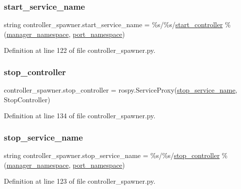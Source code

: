 \subsubsection{\texorpdfstring{start\+\_\+service\+\_\+name}{start\_service\_name}}
{\footnotesize\ttfamily string controller\+\_\+spawner.\+start\+\_\+service\+\_\+name = \textquotesingle{}\%s/\%s/\hyperlink{namespacecontroller__spawner_a1bf65f27733e8e5fcb255dd8d369da6d}{start\+\_\+controller}\textquotesingle{} \% (\hyperlink{namespacecontroller__spawner_aee6b2ce8cdb4e7ffd894cbe211b09a0c}{manager\+\_\+namespace}, \hyperlink{namespacecontroller__spawner_a831390a07e2261094656c09e0d262c14}{port\+\_\+namespace})}



Definition at line 122 of file controller\+\_\+spawner.\+py.

\mbox{\label{namespacecontroller__spawner_abb7c023c547b422e17287d367fe0de8e}} 
\subsubsection{\texorpdfstring{stop\+\_\+controller}{stop\_controller}}
{\footnotesize\ttfamily controller\+\_\+spawner.\+stop\+\_\+controller = rospy.\+Service\+Proxy(\hyperlink{namespacecontroller__spawner_addbe1e6c1654b63878f7d1d23d201d25}{stop\+\_\+service\+\_\+name}, Stop\+Controller)}



Definition at line 134 of file controller\+\_\+spawner.\+py.

\mbox{\label{namespacecontroller__spawner_addbe1e6c1654b63878f7d1d23d201d25}} 
\subsubsection{\texorpdfstring{stop\+\_\+service\+\_\+name}{stop\_service\_name}}
{\footnotesize\ttfamily string controller\+\_\+spawner.\+stop\+\_\+service\+\_\+name = \textquotesingle{}\%s/\%s/\hyperlink{namespacecontroller__spawner_abb7c023c547b422e17287d367fe0de8e}{stop\+\_\+controller}\textquotesingle{} \% (\hyperlink{namespacecontroller__spawner_aee6b2ce8cdb4e7ffd894cbe211b09a0c}{manager\+\_\+namespace}, \hyperlink{namespacecontroller__spawner_a831390a07e2261094656c09e0d262c14}{port\+\_\+namespace})}



Definition at line 123 of file controller\+\_\+spawner.\+py.

